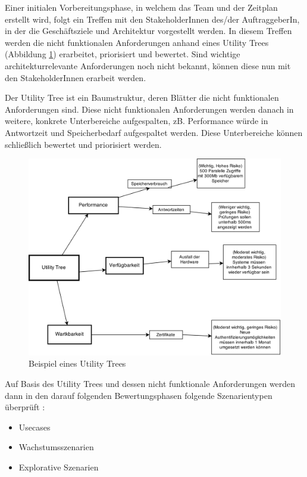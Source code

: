 Einer initialen Vorbereitungsphase, in welchem das Team und der Zeitplan erstellt wird, folgt ein Treffen mit den StakeholderInnen des/der AuftraggeberIn, in der die Geschäftsziele und Architektur vorgestellt werden. In diesem Treffen werden die nicht funktionalen Anforderungen anhand eines Utility Trees (Abbildung \ref{fig:utility}) erarbeitet, priorisiert und bewertet. Sind wichtige architekturrelevante Anforderungen noch nicht bekannt, können diese nun mit den StakeholderInnen erarbeit werden. \cite[S. 184-199]{basiswissen}

Der Utility Tree ist ein Baumstruktur, deren Blätter die nicht funktionalen Anforderungen sind. Diese nicht funktionalen Anforderungen werden danach in weitere, konkrete Unterbereiche aufgespalten, zB. Performance würde in Antwortzeit und Speicherbedarf aufgespaltet werden. Diese Unterbereiche können schließlich bewertet und priorisiert werden.

\begin{figure}[H]
    \centering
    \includegraphics[scale=0.3]{img/utilitytree.png}
    \caption{Beispiel eines Utility Trees \cite[S. 17]{ATAM}}
    \label{fig:utility}
\end{figure}

Auf Basis des Utility Trees und dessen nicht funktionale Anforderungen werden dann in den darauf folgenden Bewertungsphasen folgende Szenarientypen überprüft \cite[S. 62-67]{review}\cite[S. 188]{basiswissen}:

\begin{itemize}
  \item Usecases
  \item Wachstumsszenarien
  \item Explorative Szenarien
\end{itemize}

